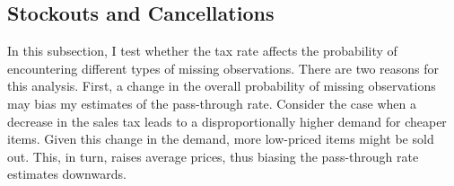 \documentclass[12pt]{article}
\begin{document}
		
		
	
	
	
	
	
	
	\subsection{Stockouts and Cancellations}
	
	In this subsection, I test whether the tax rate affects the probability of encountering different types of missing observations. There are two reasons for this analysis. First, a change in the overall probability of missing observations may bias my estimates of the pass-through rate. Consider the case when a decrease in the sales tax leads to a disproportionally higher demand for cheaper items. Given this change in the demand, more low-priced items might be sold out. This, in turn, raises average prices, thus biasing the pass-through rate estimates downwards. 
\end{document}
